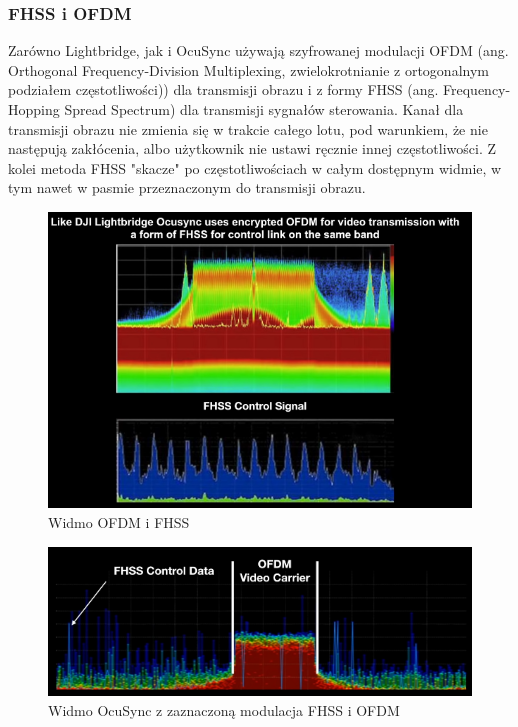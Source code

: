 \newpage
\subsubsection{FHSS i  OFDM}

Zarówno Lightbridge, jak i OcuSync używają szyfrowanej modulacji OFDM (ang. Orthogonal Frequency-Division Multiplexing, zwielokrotnianie z ortogonalnym podziałem częstotliwości)) dla transmisji obrazu i z formy FHSS (ang. Frequency-Hopping Spread Spectrum) dla transmisji sygnałów sterowania. Kanał dla transmisji obrazu nie zmienia się w trakcie całego lotu, pod warunkiem, że nie następują zakłócenia, albo użytkownik nie ustawi ręcznie innej częstotliwości. Z kolei metoda FHSS "skacze" po częstotliwościach w całym dostępnym widmie, w tym nawet w pasmie przeznaczonym do transmisji obrazu.\cite{FHSS-wiki} \cite{OFDM-wiki}

\begin{figure}[!htbp]
\begin{center}
\includegraphics[width=14cm]{./Obrazy/ocusync_spectrum_1.png}
\caption{Widmo OFDM i FHSS}
\end{center}
\end{figure}

\begin{figure}[!htbp]
\begin{center}
\includegraphics[width=14cm]{./Obrazy/ocusync_spectrum_2.png}
\caption{Widmo OcuSync z zaznaczoną modulacja FHSS i OFDM}
\end{center}
\end{figure}


